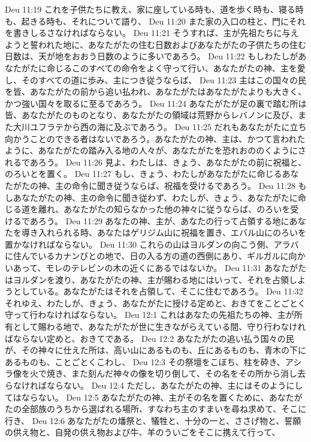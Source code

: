 Deu 11:19  これを子供たちに教え、家に座している時も、道を歩く時も、寝る時も、起きる時も、それについて語り、
Deu 11:20  また家の入口の柱と、門にそれを書きしるさなければならない。
Deu 11:21  そうすれば、主が先祖たちに与えようと誓われた地に、あなたがたの住む日数およびあなたがたの子供たちの住む日数は、天が地をおおう日数のように多いであろう。
Deu 11:22  もしわたしがあなたがたに命じるこのすべての命令をよく守って行い、あなたがたの神、主を愛し、そのすべての道に歩み、主につき従うならば、
Deu 11:23  主はこの国々の民を皆、あなたがたの前から追い払われ、あなたがたはあなたがたよりも大きく、かつ強い国々を取るに至るであろう。
Deu 11:24  あなたがたが足の裏で踏む所は皆、あなたがたのものとなり、あなたがたの領域は荒野からレバノンに及び、また大川ユフラテから西の海に及ぶであろう。
Deu 11:25  だれもあなたがたに立ち向かうことのできる者はないであろう。あなたがたの神、主は、かつて言われたように、あなたがたの踏み入る地の人々が、あなたがたを恐れおののくようにされるであろう。
Deu 11:26  見よ、わたしは、きょう、あなたがたの前に祝福と、のろいとを置く。
Deu 11:27  もし、きょう、わたしがあなたがたに命じるあなたがたの神、主の命令に聞き従うならば、祝福を受けるであろう。
Deu 11:28  もしあなたがたの神、主の命令に聞き従わず、わたしが、きょう、あなたがたに命じる道を離れ、あなたがたの知らなかった他の神々に従うならば、のろいを受けるであろう。
Deu 11:29  あなたの神、主が、あなたの行って占領する地にあなたを導き入れられる時、あなたはゲリジム山に祝福を置き、エバル山にのろいを置かなければならない。
Deu 11:30  これらの山はヨルダンの向こう側、アラバに住んでいるカナンびとの地で、日の入る方の道の西側にあり、ギルガルに向かいあって、モレのテレビンの木の近くにあるではないか。
Deu 11:31  あなたがたはヨルダンを渡り、あなたがたの神、主が賜わる地にはいって、それを占領しようとしている。あなたがたはそれを占領して、そこに住むであろう。
Deu 11:32  それゆえ、わたしが、きょう、あなたがたに授ける定めと、おきてをことごとく守って行わなければならない。
Deu 12:1  これはあなたの先祖たちの神、主が所有として賜わる地で、あなたがたが世に生きながらえている間、守り行わなければならない定めと、おきてである。
Deu 12:2  あなたがたの追い払う国々の民が、その神々に仕えた所は、高い山にあるものも、丘にあるものも、青木の下にあるものも、ことごとくこわし、
Deu 12:3  その祭壇をこぼち、柱を砕き、アシラ像を火で焼き、また刻んだ神々の像を切り倒して、その名をその所から消し去らなければならない。
Deu 12:4  ただし、あなたがたの神、主にはそのようにしてはならない。
Deu 12:5  あなたがたの神、主がその名を置くために、あなたがたの全部族のうちから選ばれる場所、すなわち主のすまいを尋ね求めて、そこに行き、
Deu 12:6  あなたがたの燔祭と、犠牲と、十分の一と、ささげ物と、誓願の供え物と、自発の供え物および牛、羊のういごをそこに携えて行って、
